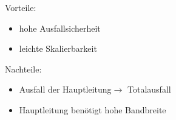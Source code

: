 \documentclass[12pt,a4paper]{article}
\begin{document}
\begin{minipage}[t]{.48\textwidth}
\begin{flushleft}
\newline
        \small Vorteile:
            \begin{itemize}
                \small
                \item hohe Ausfallsicherheit
                \item leichte Skalierbarkeit
            \end{itemize}
        \small Nachteile:
            \begin{itemize}
                \small
                \item Ausfall der Hauptleitung\newline $\longrightarrow$ Totalausfall
                \item Hauptleitung benötigt hohe Bandbreite
            \end{itemize}
		\end{flushleft}
	\end{minipage}
\end{document}
